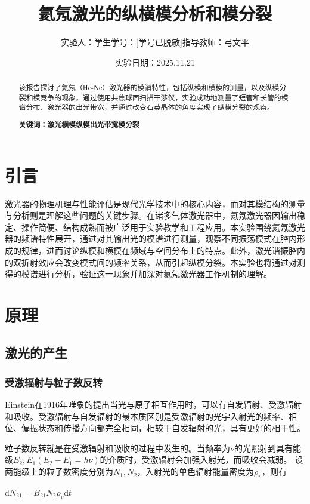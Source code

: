 \documentclass[a4paper, 1.5lines]{ctexart}
\title{氦氖激光的纵横模分析和模分裂}
\author{实验人：学生\qquad 学号：[学号已脱敏]\qquad 指导教师：弓文平}
\date{实验日期：2025.11.21}
\begin{document}
    
    \maketitle
    
    \begin{abstract}
         该报告探讨了氦氖（He-Ne）激光器的模谱特性，包括纵模和横模的测量，以及纵模分裂和模竞争的现象。通过使用共焦球面扫描干涉仪，实验成功地测量了短管和长管的模谱分布、激光器的出光带宽，并通过改变石英晶体的角度实现了纵模分裂的观察。
        
         \textbf{\textbf{关键词：激光\quad 横模\quad 纵模\quad 出光带宽\quad 模分裂}}
    \end{abstract}
    
    \section{引言}
        激光器的物理机理与性能评估是现代光学技术中的核心内容，而对其模结构的测量与分析则是理解这些问题的关键步骤。在诸多气体激光器中，氦氖激光器因输出稳定、操作简便、结构成熟而被广泛用于实验教学和工程应用。本实验围绕氦氖激光器的频谱特性展开，通过对其输出光的模谱进行测量，观察不同振荡模式在腔内形成的规律，进而讨论纵模和横模在频域与空间分布上的特点。此外，激光谐振腔内的双折射效应会改变模式间的频率关系，从而引起纵模分裂。本实验也将通过对测得的模谱进行分析，验证这一现象并加深对氦氖激光器工作机制的理解。
    \section{原理}
        \subsection{激光的产生}
            \subsubsection{受激辐射与粒子数反转}
            Einstein在1916年唯象的提出当光与原子相互作用时，可以有自发辐射、受激辐射和吸收。受激辐射与自发辐射的最本质区别是受激辐射的光宇入射光的频率、相位、偏振状态和传播方向都完全相同，相较于自发辐射的光，具有更好的相干性。

            粒子数反转就是在受激辐射和吸收的过程中发生的。当频率为$\nu$的光照射到具有能级$E_2,E_1(E_2-E_1 = h\nu)$的介质时，受激辐射会加强入射光，而吸收会减弱。
            设两能级上的粒子数密度分别为$N_1,N_2$，入射光的单色辐射能量密度为$\rho_v$，则有

            \centerline{$\mathrm{d}N_{21} = B_{21} N_2 \rho_v \mathrm{d}t$}
\end{document}

